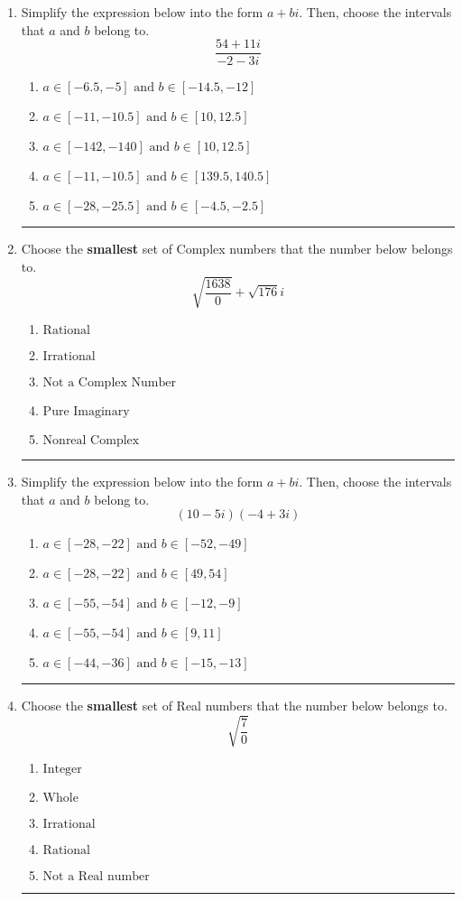 \documentclass[14pt]{extbook}
\newcommand{\litem}[1]{\item#1\hspace*{-1cm}\rule{\textwidth}{0.4pt}}
\begin{document}
\begin{enumerate}
{\begin{enumerate}[label=\Alph*.]
\end{enumerate} }
\litem{
Simplify the expression below into the form $a+bi$. Then, choose the intervals that $a$ and $b$ belong to.\[ \frac{54 + 11 i}{-2 - 3 i} \]\begin{enumerate}[label=\Alph*.]
\item \( a \in [-6.5, -5] \text{ and } b \in [-14.5, -12] \)
\item \( a \in [-11, -10.5] \text{ and } b \in [10, 12.5] \)
\item \( a \in [-142, -140] \text{ and } b \in [10, 12.5] \)
\item \( a \in [-11, -10.5] \text{ and } b \in [139.5, 140.5] \)
\item \( a \in [-28, -25.5] \text{ and } b \in [-4.5, -2.5] \)

\end{enumerate} }
\litem{
Choose the \textbf{smallest} set of Complex numbers that the number below belongs to.\[ \sqrt{\frac{1638}{0}}+\sqrt{176} i \]\begin{enumerate}[label=\Alph*.]
\item \( \text{Rational} \)
\item \( \text{Irrational} \)
\item \( \text{Not a Complex Number} \)
\item \( \text{Pure Imaginary} \)
\item \( \text{Nonreal Complex} \)

\end{enumerate} }
\litem{
Simplify the expression below into the form $a+bi$. Then, choose the intervals that $a$ and $b$ belong to.\[ (10 - 5 i)(-4 + 3 i) \]\begin{enumerate}[label=\Alph*.]
\item \( a \in [-28, -22] \text{ and } b \in [-52, -49] \)
\item \( a \in [-28, -22] \text{ and } b \in [49, 54] \)
\item \( a \in [-55, -54] \text{ and } b \in [-12, -9] \)
\item \( a \in [-55, -54] \text{ and } b \in [9, 11] \)
\item \( a \in [-44, -36] \text{ and } b \in [-15, -13] \)

\end{enumerate} }
\litem{
Choose the \textbf{smallest} set of Real numbers that the number below belongs to.\[ \sqrt{\frac{7}{0}} \]\begin{enumerate}[label=\Alph*.]
\item \( \text{Integer} \)
\item \( \text{Whole} \)
\item \( \text{Irrational} \)
\item \( \text{Rational} \)
\item \( \text{Not a Real number} \)


\end{enumerate}}
\end{enumerate}
\end{document}
